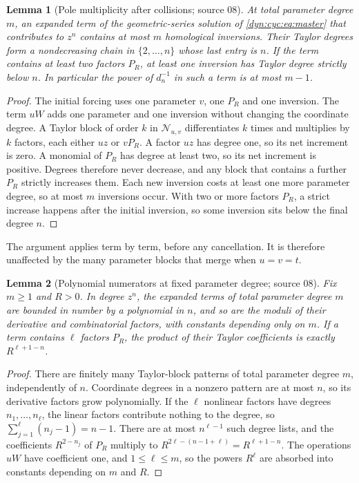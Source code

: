 \documentclass[11pt,letterpaper]{article}
\newtheorem{lemma}[lemma]{Lemma}
\theoremstyle{definition}
\theoremstyle{remark}
\newcommand{\NN}{\mathcal N}
\numberwithin{equation}{section}
\begin{document}
\begin{lemma}[Pole multiplicity after collisions; source 08]
\label{dyn:cyc:lem:chains}
At total parameter degree $m$, an expanded term of the geometric-series
solution of \eqref{dyn:cyc:eq:master} that contributes to $z^{n}$ contains at
most $m$ homological inversions. Their Taylor degrees form a nondecreasing
chain in $\{2,\dots,n\}$ whose last entry is $n$. If the term contains at
least two factors $P_R$, at least one inversion has Taylor degree strictly
below $n$. In particular the power of $d_n^{-1}$ in such a term is at most
$m-1$.
\end{lemma}
\begin{proof}
The initial forcing uses one parameter $v$, one $P_R$ and one inversion. The
term $uW$ adds one parameter and one inversion without changing the
coordinate degree. A Taylor block of order $k$ in $\NN_{u,v}$ differentiates
$k$ times and multiplies by $k$ factors, each either $uz$ or $vP_R$. A factor
$uz$ has degree one, so its net increment is zero. A monomial of $P_R$ has
degree at least two, so its net increment is positive. Degrees therefore
never decrease, and any block that contains a further $P_R$ strictly
increases them. Each new inversion costs at least one more parameter
degree, so at most $m$ inversions occur. With two or more factors $P_R$, a
strict increase happens after the initial inversion, so some inversion sits
below the final degree $n$.
\end{proof}

The argument applies term by term, before any cancellation. It is therefore
unaffected by the many parameter blocks that merge when $u=v=t$.

\begin{lemma}[Polynomial numerators at fixed parameter degree; source 08]
\label{dyn:cyc:lem:majorant}
Fix $m\ge1$ and $R>0$. In degree $z^{n}$, the expanded terms of total
parameter degree $m$ are bounded in number by a polynomial in $n$, and so
are the moduli of their derivative and combinatorial factors, with constants
depending only on $m$. If a term contains $\ell$ factors $P_R$, the product
of their Taylor coefficients is exactly $R^{\ell+1-n}$.
\end{lemma}
\begin{proof}
There are finitely many Taylor-block patterns of total parameter degree
$m$, independently of $n$. Coordinate degrees in a nonzero pattern are at
most $n$, so its derivative factors grow polynomially. If the $\ell$
nonlinear factors have degrees $n_1,\dots,n_\ell$, the linear factors
contribute nothing to the degree, so $\sum_{j=1}^{\ell}(n_j-1)=n-1$. There
are at most $n^{\ell-1}$ such degree lists, and the coefficients
$R^{2-n_j}$ of $P_R$ multiply to $R^{2\ell-(n-1+\ell)}=R^{\ell+1-n}$. The
operations $uW$ have coefficient one, and $1\le\ell\le m$, so the powers
$R^{\ell}$ are absorbed into constants depending on $m$ and $R$.
\end{proof}
\end{document}
